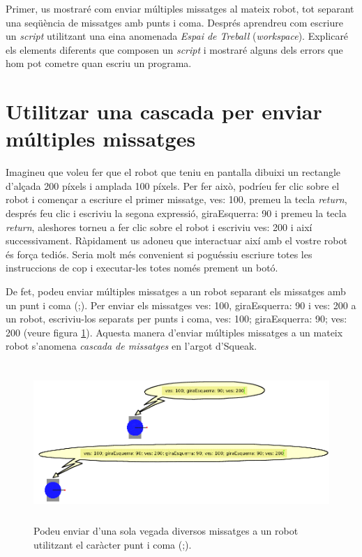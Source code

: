 Primer, us mostraré com enviar múltiples missatges al mateix robot, tot separant una seqüència de missatges amb punts i coma. Després aprendreu com escriure un \emph{script} utilitzant una eina anomenada \emph{Espai de Treball} (\emph{workspace}). Explicaré els elements diferents que composen un \emph{script} i mostraré alguns dels errors que hom pot cometre quan escriu un  programa.

\section{Utilitzar una cascada per enviar múltiples missatges}
Imagineu que voleu fer que el robot que teniu en pantalla dibuixi un rectangle d'alçada 200 píxels i amplada 100 píxels. Per fer això, podríeu fer clic sobre el robot i començar a escriure el primer missatge, \textsf{ves: 100}, premeu la tecla \emph{return}, després feu clic i escriviu la segona expressió, \textsf{giraEsquerra: 90} i premeu la tecla \emph{return}, aleshores torneu a fer clic sobre el robot i escriviu \textsf{ves: 200} i així successivament. Ràpidament us adoneu que interactuar així amb el vostre robot és força tediós. Seria molt més convenient si poguéssiu escriure totes les instruccions de cop i executar-les totes només prement un botó.

De fet, podeu enviar múltiples missatges a un robot separant els missatges amb un punt i coma (\textsf{;}). Per enviar els missatges \textsf{ves: 100}, \textsf{giraEsquerra: 90} i \textsf{ves: 200} a un robot, escriviu-los separats per punts i coma, \textsf{ves: 100; giraEsquerra: 90; ves: 200} (veure figura \ref{fig0201}). Aquesta manera d'enviar múltiples missatges a un mateix robot s'anomena \emph{cascada de missatges} en l'argot d'Squeak. 

\begin{figure}[h]
\begin{center}
\includegraphics[height=60mm ,width=144mm ]{Imatges/figura2-1.png}
\end{center}
\caption{Podeu enviar d'una sola vegada diversos missatges a un robot utilitzant el caràcter punt i coma (\textsf{\upshape ;}).}
\label{fig0201}
\end{figure}

